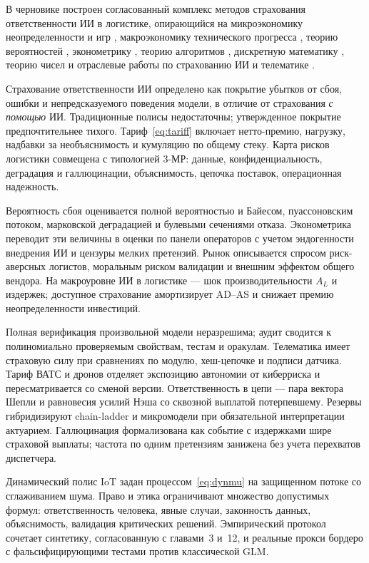 \documentclass[a4paper,14pt]{extarticle}
\begin{document}
В черновике построен согласованный комплекс методов страхования ответственности ИИ в логистике, опирающийся на микроэкономику неопределенности и игр \cite{pindyck}, макроэкономику технического прогресса \cite{blanchard}, теорию вероятностей \cite{shvedov}, эконометрику \cite{verbeek}, теорию алгоритмов \cite{vereshchagin, cormen}, дискретную математику \cite{yablonsky}, теорию чисел \cite{borevich} и отраслевые работы по страхованию ИИ и телематике \cite{zezina, maglinova, sabitov, cbr, insurtech, fz169}.

Страхование ответственности ИИ определено как покрытие убытков от сбоя, ошибки и непредсказуемого поведения модели, в отличие от страхования \emph{с помощью} ИИ. Традиционные полисы недостаточны; утвержденное покрытие предпочтительнее тихого. Тариф~\eqref{eq:tariff} включает нетто-премию, нагрузку, надбавки за необъяснимость и кумуляцию по общему стеку. Карта рисков логистики совмещена с типологией 3-МР: данные, конфиденциальность, деградация и галлюцинации, объяснимость, цепочка поставок, операционная надежность.

Вероятность сбоя оценивается полной вероятностью и Байесом, пуассоновским потоком, марковской деградацией и булевыми сечениями отказа. Эконометрика переводит эти величины в оценки по панели операторов с учетом эндогенности внедрения ИИ и цензуры мелких претензий. Рынок описывается спросом риск-аверсных логистов, моральным риском валидации и внешним эффектом общего вендора. На макроуровне ИИ в логистике --- шок производительности $A_L$ и издержек; доступное страхование амортизирует AD--AS и снижает премию неопределенности инвестиций.

Полная верификация произвольной модели неразрешима; аудит сводится к полиномиально проверяемым свойствам, тестам и оракулам. Телематика имеет страховую силу при сравнениях по модулю, хеш-цепочке и подписи датчика. Тариф ВАТС и дронов отделяет экспозицию автономии от киберриска и пересматривается со сменой версии. Ответственность в цепи --- пара вектора Шепли и равновесия усилий Нэша со сквозной выплатой потерпевшему. Резервы гибридизируют chain-ladder и микромодели при обязательной интерпретации актуарием. Галлюцинация формализована как событие с издержками шире страховой выплаты; частота по одним претензиям занижена без учета перехватов диспетчера.

Динамический полис IoT задан процессом~\eqref{eq:dynmu} на защищенном потоке со сглаживанием шума. Право и этика ограничивают множество допустимых формул: ответственность человека, явные случаи, законность данных, объяснимость, валидация критических решений. Эмпирический протокол сочетает синтетику, согласованную с главами~3 и~12, и реальные прокси бордеро с фальсифицирующими тестами против классической GLM.
\end{document}
